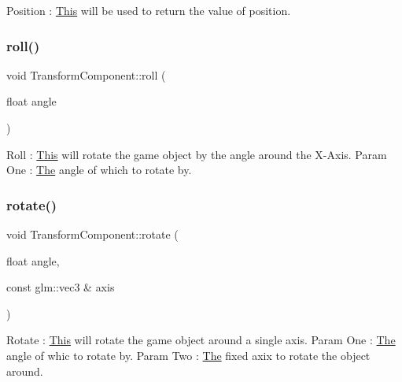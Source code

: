 Position \+: \mbox{\hyperlink{class_this}{This}} will be used to return the value of position. \mbox{\label{class_transform_component_ae38356794f70a3838b7c690d3bb0bef7}} 
\subsubsection{\texorpdfstring{roll()}{roll()}}
{\footnotesize\ttfamily void Transform\+Component\+::roll (\begin{DoxyParamCaption}\item[{float}]{angle }\end{DoxyParamCaption})\hspace{0.3cm}{\ttfamily [inline]}}

Roll \+: \mbox{\hyperlink{class_this}{This}} will rotate the game object by the angle around the X-\/\+Axis. Param One \+: \mbox{\hyperlink{class_the}{The}} angle of which to rotate by. \mbox{\label{class_transform_component_a54f3f0e7924028bb32279aac3938a149}} 
\subsubsection{\texorpdfstring{rotate()}{rotate()}\hspace{0.1cm}{\footnotesize\ttfamily [1/2]}}
{\footnotesize\ttfamily void Transform\+Component\+::rotate (\begin{DoxyParamCaption}\item[{float}]{angle,  }\item[{const glm\+::vec3 \&}]{axis }\end{DoxyParamCaption})\hspace{0.3cm}{\ttfamily [inline]}}

Rotate \+: \mbox{\hyperlink{class_this}{This}} will rotate the game object around a single axis. Param One \+: \mbox{\hyperlink{class_the}{The}} angle of whic to rotate by. Param Two \+: \mbox{\hyperlink{class_the}{The}} fixed axix to rotate the object around. \mbox{\label{class_transform_component_a7c97e7f1e9924b811319acb73accde72}} 

